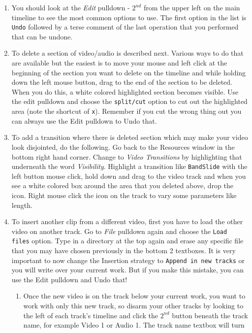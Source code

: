 \begin{enumerate}
	\item You should look at the \textit{Edit} pulldown - $2^{nd}$ from the upper left on the main timeline to see the
	most common options to use.  The first option in the list is \texttt{Undo} followed by a terse comment of  
	the last operation that you performed that can be undone.
	\item To delete a section of video/audio is described next.  Various ways to do that are available but the
	easiest is to move your mouse and left click at the beginning of the section you want to delete on the
	timeline and while holding down the left mouse button, drag to the end of the section to be deleted. 
	When you do this, a white colored highlighted section becomes visible.  Use the edit pulldown and
	choose the \texttt{split/cut} option to cut out the highlighted area (note the shortcut of \texttt{x}).  Remember if you
	cut the wrong thing out you can always use the Edit pulldown to Undo that.
	\item To add a transition where there is deleted section which may make your video look disjointed, do
	the following.   Go back to the Resources window in the bottom right hand corner.  Change to
	\textit{Video Transitions} by highlighting that underneath the word \textit{Visibility}.  Highlight a transition like
	\texttt{BandSlide} with the left button mouse click, hold down and drag to the video track and when you see
	a white colored box around the area that you deleted above, drop the icon.  Right mouse click the
	icon on the track to vary some parameters like length.
	\item  To insert another clip from a different video, first you have to load the other video on another track.
	Go to \textit{File} pulldown again and choose the \texttt{Load files} option.  Type in a directory at the top again and
	erase any specific file that you may have chosen previously in the bottom 2 textboxes.  It is very
	important to now change the Insertion strategy to \texttt{Append in new tracks} or you will write over
	your current work.  But if you make this mistake, you can use the Edit pulldown and Undo that!
	\begin{enumerate}
		\item Once the new video is on the track below your current work, you want to work with only this new 
		track, so disarm your other tracks by looking to the left of each track’s timeline and click the $2^{nd}$ 
		button beneath the track name, for example Video 1 or Audio 1.  The track name textbox will turn

\end{enumerate}
\end{enumerate}
